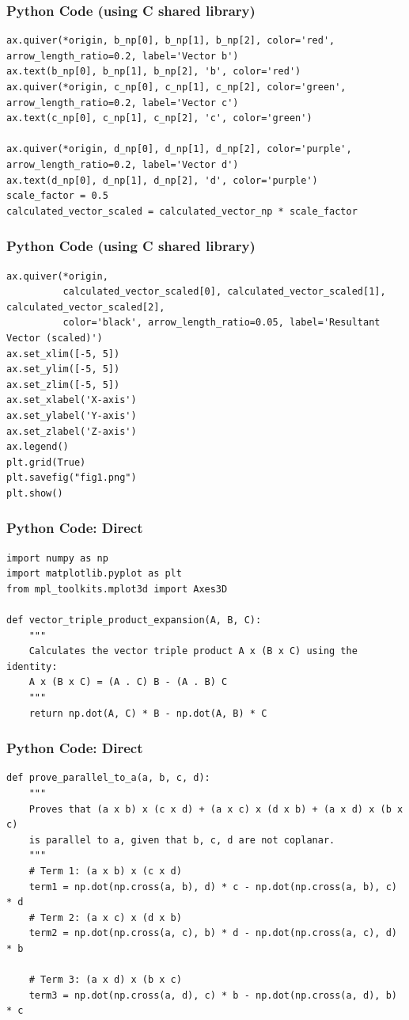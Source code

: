 \documentclass{beamer}
\begin{document}
\begin{frame}[fragile]
\frametitle{Python Code (using C shared library)}
\begin{lstlisting}
ax.quiver(*origin, b_np[0], b_np[1], b_np[2], color='red', arrow_length_ratio=0.2, label='Vector b')
ax.text(b_np[0], b_np[1], b_np[2], 'b', color='red')
ax.quiver(*origin, c_np[0], c_np[1], c_np[2], color='green', arrow_length_ratio=0.2, label='Vector c')
ax.text(c_np[0], c_np[1], c_np[2], 'c', color='green')

ax.quiver(*origin, d_np[0], d_np[1], d_np[2], color='purple', arrow_length_ratio=0.2, label='Vector d')
ax.text(d_np[0], d_np[1], d_np[2], 'd', color='purple')
scale_factor = 0.5
calculated_vector_scaled = calculated_vector_np * scale_factor
\end{lstlisting}
\end{frame}

\begin{frame}[fragile]
\frametitle{Python Code (using C shared library)}
\begin{lstlisting}
ax.quiver(*origin,
          calculated_vector_scaled[0], calculated_vector_scaled[1], calculated_vector_scaled[2],
          color='black', arrow_length_ratio=0.05, label='Resultant Vector (scaled)')
ax.set_xlim([-5, 5])
ax.set_ylim([-5, 5])
ax.set_zlim([-5, 5])
ax.set_xlabel('X-axis')
ax.set_ylabel('Y-axis')
ax.set_zlabel('Z-axis')
ax.legend()
plt.grid(True)
plt.savefig("fig1.png")
plt.show()
\end{lstlisting}
\end{frame}

\begin{frame}[fragile]
\frametitle{Python Code: Direct}
\begin{lstlisting}
import numpy as np
import matplotlib.pyplot as plt
from mpl_toolkits.mplot3d import Axes3D

def vector_triple_product_expansion(A, B, C):
    """
    Calculates the vector triple product A x (B x C) using the identity:
    A x (B x C) = (A . C) B - (A . B) C
    """
    return np.dot(A, C) * B - np.dot(A, B) * C
\end{lstlisting}
\end{frame}

\begin{frame}[fragile]
\frametitle{Python Code: Direct}
\begin{lstlisting}
def prove_parallel_to_a(a, b, c, d):
    """
    Proves that (a x b) x (c x d) + (a x c) x (d x b) + (a x d) x (b x c)
    is parallel to a, given that b, c, d are not coplanar.
    """
    # Term 1: (a x b) x (c x d)
    term1 = np.dot(np.cross(a, b), d) * c - np.dot(np.cross(a, b), c) * d
    # Term 2: (a x c) x (d x b)
    term2 = np.dot(np.cross(a, c), b) * d - np.dot(np.cross(a, c), d) * b

    # Term 3: (a x d) x (b x c)
    term3 = np.dot(np.cross(a, d), c) * b - np.dot(np.cross(a, d), b) * c
\end{lstlisting}
\end{frame}
\end{document}
